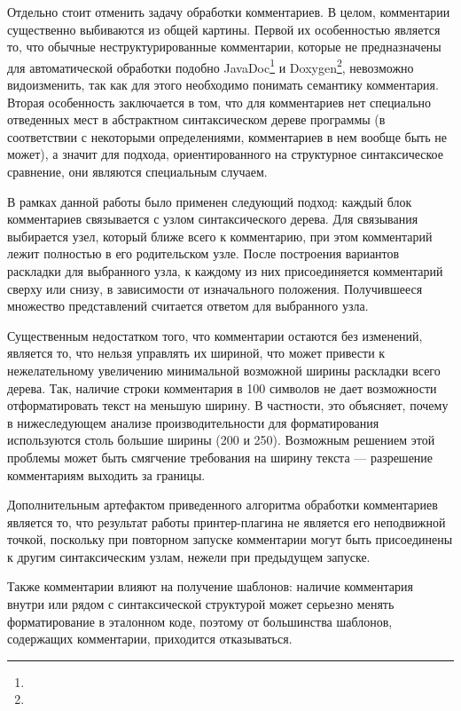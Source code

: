 Отдельно стоит отменить задачу обработки комментариев. В целом, комментарии
существенно выбиваются из общей картины. Первой их особенностью является то,
что обычные неструктурированные комментарии, которые не
предназначены для автоматической обработки подобно
JavaDoc\footnote{}
и Doxygen\footnote{},
невозможно видоизменить, так как для этого необходимо понимать семантику
комментария. Вторая особенность заключается в том, что для комментариев нет
специально отведенных мест в абстрактном синтаксическом дереве программы
(в соответствии с некоторыми определениями, комментариев в нем вообще быть не может),
а значит для подхода, ориентированного на структурное синтаксическое сравнение, они
являются специальным случаем.

В рамках данной работы было применен следующий подход: каждый блок комментариев
связывается с узлом синтаксического дерева. Для связывания выбирается узел, который
ближе всего к комментарию, при этом комментарий лежит полностью в его родительском узле.
После построения вариантов раскладки для выбранного узла, к каждому из них
присоединяется комментарий сверху или снизу, в зависимости от изначального положения.
Получившееся множество представлений считается ответом для выбранного узла.

Существенным недостатком того, что комментарии остаются без изменений,
является то, что нельзя управлять их шириной, что может привести к нежелательному
увеличению минимальной возможной ширины раскладки всего дерева.
Так, наличие строки комментария в
100 символов не дает возможности отформатировать текст на меньшую ширину.
В частности, это объясняет, почему в нижеследующем анализе производительности для
форматирования используются столь большие ширины (200 и 250). Возможным решением
этой проблемы может быть смягчение требования на ширину текста --- разрешение
комментариям выходить за границы.

Дополнительным артефактом приведенного алгоритма обработки комментариев является то,
что результат работы
принтер-плагина не является его неподвижной точкой, поскольку при повторном запуске
комментарии могут быть присоединены к другим синтаксическим узлам, нежели при предыдущем
запуске.

Также комментарии влияют на получение шаблонов:
наличие комментария внутри или рядом с синтаксической структурой
может серьезно менять форматирование в эталонном коде, поэтому от большинства
шаблонов, содержащих комментарии, приходится отказываться.

